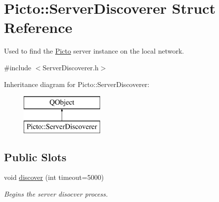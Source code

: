 \hypertarget{struct_picto_1_1_server_discoverer}{\section{Picto\-:\-:Server\-Discoverer Struct Reference}
\label{struct_picto_1_1_server_discoverer}
}


Used to find the \hyperlink{namespace_picto}{Picto} server instance on the local network.  




{\ttfamily \#include $<$Server\-Discoverer.\-h$>$}

Inheritance diagram for Picto\-:\-:Server\-Discoverer\-:\begin{figure}[H]
\begin{center}
\leavevmode
\includegraphics[height=2.000000cm]{struct_picto_1_1_server_discoverer}
\end{center}
\end{figure}
\subsection*{Public Slots}
\begin{DoxyCompactItemize}
\item 
void \hyperlink{struct_picto_1_1_server_discoverer_afdbfa7e1d36d540892d1fae30505ca42}{discover} (int timeout=5000)
\begin{DoxyCompactList}\small\item\em Begins the server disocver process. \end{DoxyCompactList}\end{DoxyCompactItemize}

